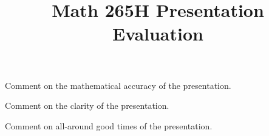 \documentclass[answers,addpoints,12pt]{exam}
\title{Math 265H Presentation Evaluation}\date{}
\begin{document}
\maketitle
\thispagestyle{empty}

\begin{questions}

\question[3] Comment on the mathematical accuracy of the presentation.
\vspace{1.5in}

\question[3] Comment on the clarity of the presentation.
\vspace{1.5in}

\question[4] Comment on all-around good times of the presentation.

\vfill
\begin{center}\gradetable[h][questions]\end{center}

\end{questions}
\end{document}
